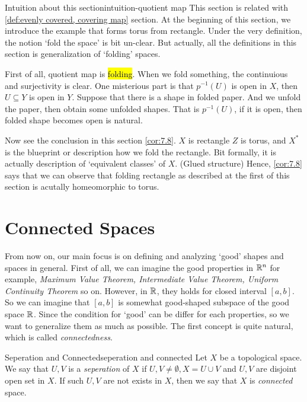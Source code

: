 \documentclass[12pt, a4paper, twoside]{article}
\theoremstyle{plain}
\begin{document}
\begin{rem}{Intuition about this section}{intuition-quotient map}
    This section is related with \ref{def:evenly covered, covering map} section. 
    At the beginning of this section, we introduce the example that forms torus from rectangle. 
    Under the very definition, the notion \lq fold the space' is bit un-clear. 
    But actually, all the definitions in this section is generalization of \lq folding' spaces. 
    
    First of all, quotient map is \hl{folding}. When we fold something, the continuious and 
    surjectivity is clear. 
    One misterious part is that $p^{-1}(U)$ is open in $X$, then $U \subseteq Y$ is open in $Y$.
    Suppose that there is a shape in folded paper. 
    And we unfold the paper, then obtain some unfolded shapes. 
    That is $p^{-1}(U)$, if it is open, then folded shape becomes open is natural. 

    Now see the conclusion in this section \ref{cor:7.8}. 
    $X$ is rectangle $Z$ is torus, and $X^*$ is the blueprint or description how we fold the rectangle. 
    Bit formally, it is actually description of \lq equivalent classes' of $X$. (Glued structure) 
    Hence, \ref{cor:7.8} says that we can observe that folding rectangle as described at the first of this 
    section is acutally homeomorphic to torus. 
\end{rem}

\newpage 

\section{Connected Spaces}

From now on, our main focus is on defining and analyzing \lq good' shapes and spaces in general. 
First of all, we can imagine the good properties in ${\mathbb {R}}^n$ for example, \textit{Maximum Value Theorem, Intermediate Value Theorem, Uniform Continuity Theorem} so on. 
However, in ${\mathbb {R}}$, they holds for closed interval $[a, b]$. So we can imagine that $[a, b]$ is somewhat good-shaped subspace of the good space ${\mathbb {R}}$. 
Since the condition for \lq good' can be differ for each properties, so we want to generalize them as much as possible. 
The first concept is quite natural, which is called \textit{connectedness}. 

\begin{defn}{Seperation and Connected}{seperation and connected}
    Let $X$ be a topological space. 
    We say that $U, V$ is a \textit{seperation} of $X$ if 
    $U, V \neq \emptyset, X = U \cup V$ and $U, V$ are disjoint open set in $X$. 
    If such $U, V$ are not exists in $X$, then we say that $X$ is \textit{connected} space. 
\end{defn}
\end{document}
